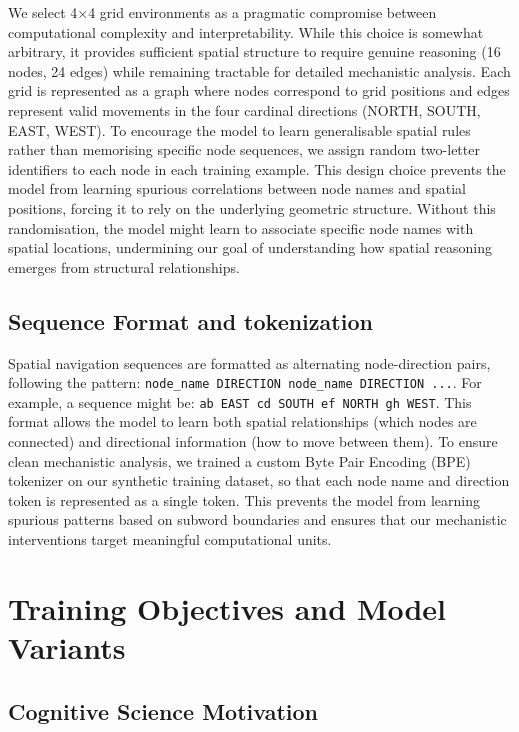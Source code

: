We select 4×4 grid environments as a pragmatic compromise between computational complexity and interpretability. While this choice is somewhat arbitrary, it provides sufficient spatial structure to require genuine reasoning (16 nodes, 24 edges) while remaining tractable for detailed mechanistic analysis. Each grid is represented as a graph where nodes correspond to grid positions and edges represent valid movements in the four cardinal directions (NORTH, SOUTH, EAST, WEST). To encourage the model to learn generalisable spatial rules rather than memorising specific node sequences, we assign random two-letter identifiers to each node in each training example. This design choice prevents the model from learning spurious correlations between node names and spatial positions, forcing it to rely on the underlying geometric structure. Without this randomisation, the model might learn to associate specific node names with spatial locations, undermining our goal of understanding how spatial reasoning emerges from structural relationships.

\subsection{Sequence Format and tokenization}

Spatial navigation sequences are formatted as alternating node-direction pairs, following the pattern: \texttt{node\_name DIRECTION node\_name DIRECTION ...}. For example, a sequence might be: \texttt{ab EAST cd SOUTH ef NORTH gh WEST}. This format allows the model to learn both spatial relationships (which nodes are connected) and directional information (how to move between them). To ensure clean mechanistic analysis, we trained a custom Byte Pair Encoding (BPE) tokenizer on our synthetic training dataset, so that each node name and direction token is represented as a single token. This prevents the model from learning spurious patterns based on subword boundaries and ensures that our mechanistic interventions target meaningful computational units. %

\section{Training Objectives and Model Variants}

\subsection{Cognitive Science Motivation}

